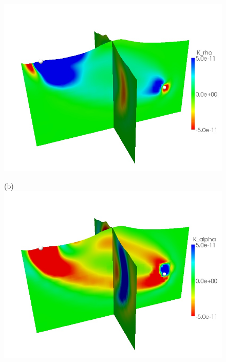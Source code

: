 \documentclass[referee,extra]{gji}
\begin{document}
\begin{figure}
\begin{center}
\begin{minipage}[t]{0.49\textwidth}
\begin{center}
\includegraphics[width=1.\textwidth]{./images/mount_rho_kernel.jpg}
\end{center}
\end{minipage}
\begin{minipage}[t]{0.49\textwidth}
\begin{center}
(b)\\
\includegraphics[width=1.\textwidth]{./images/mount_alpha_kernel.jpg} \\

\end{center}
\end{minipage}
\end{center}
\end{figure}
\end{document}
